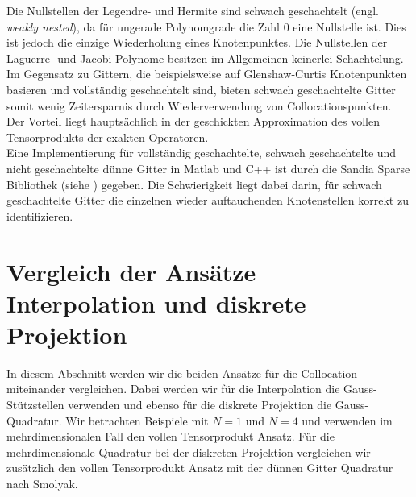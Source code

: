 Die Nullstellen der Legendre- und Hermite sind schwach geschachtelt (engl. \emph{weakly nested}), da für ungerade Polynomgrade die Zahl $0$ eine Nullstelle ist. Dies ist jedoch die einzige Wiederholung eines Knotenpunktes. Die Nullstellen der Laguerre- und Jacobi-Polynome besitzen im Allgemeinen keinerlei Schachtelung.\\
Im Gegensatz zu Gittern, die beispielsweise auf Glenshaw-Curtis Knotenpunkten basieren und vollständig geschachtelt sind, bieten schwach geschachtelte Gitter somit wenig Zeitersparnis durch Wiederverwendung von Collocationspunkten. Der Vorteil liegt hauptsächlich in der geschickten Approximation des vollen Tensorprodukts der exakten Operatoren.\\
Eine Implementierung für vollständig geschachtelte, schwach geschachtelte und nicht geschachtelte dünne Gitter in Matlab und C++ ist durch die Sandia Sparse Bibliothek (siehe \autocite{Sandia}) gegeben. Die Schwierigkeit liegt dabei darin, für schwach geschachtelte Gitter die einzelnen wieder auftauchenden Knotenstellen korrekt zu identifizieren. 


\section{Vergleich der Ansätze Interpolation und diskrete Projektion}
In diesem Abschnitt werden wir die beiden Ansätze für die Collocation miteinander vergleichen. Dabei werden wir für die Interpolation die Gauss-Stützstellen verwenden und ebenso für die diskrete Projektion die Gauss-Quadratur. Wir betrachten Beispiele mit $N=1$ und $N=4$ und verwenden im mehrdimensionalen Fall den vollen Tensorprodukt Ansatz. Für die mehrdimensionale Quadratur bei der diskreten Projektion vergleichen wir zusätzlich den vollen Tensorprodukt Ansatz mit der dünnen Gitter Quadratur nach Smolyak.
